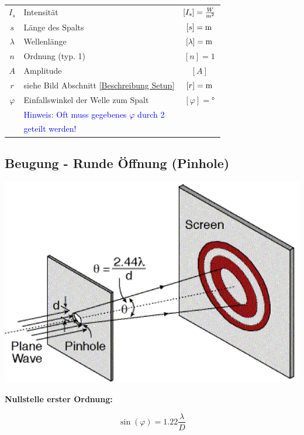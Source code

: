 \renewcommand{\arraystretch}{1.1}
\begin{tabular}{clc}
$I_s$ & Intensität & $[I_s] = \frac{W}{\mathrm{m}^2}$ \\
$s$ & Länge des Spalts & $[s] = \mathrm{m}$ \\
$\lambda$ & Wellenlänge & $[\lambda]= \mathrm{m}$ \\
$n$ & Ordnung (typ. 1) & $[n] = 1$ \\
$A$ & Amplitude & $[A]$ \\
$r$ & siehe Bild Abschnitt \ref{Beschreibung Setup} & $[r] = \mathrm{m}$ \\
$\varphi$ & Einfallswinkel der Welle zum Spalt & $[\varphi] =$° \\
 & \textcolor{blue}{Hinweis: Oft muss gegebenes $\varphi$ durch 2} & \\
 & \textcolor{blue}{geteilt werden!} \\
\end{tabular}
\renewcommand{\arraystretch}{1}



\subsection{Beugung - Runde Öffnung (Pinhole)}

\begin{minipage}{0.48\linewidth}
\includegraphics[width=0.98\linewidth]{Bilder/Wellen-Optik/beugung_loch} \\
\end{minipage}
\hfill
\begin{minipage}{0.48\linewidth}
\textbf{Nullstelle erster Ordnung:} 

$$ \boxed{ \sin(\varphi) = 1.22 \frac{\lambda}{D} } $$ 
\end{minipage}


